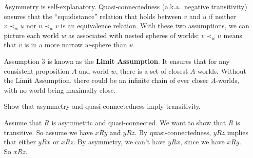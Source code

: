 Asymmetry is self-explanatory. Quasi-connectedness (a.k.a.\ negative
transitivity) ensures that the ``equidistance'' relation that holds between $v$
and $u$ if neither $v \prec_w u$ nor $u \prec_w v$ is an equivalence relation.
With these two assumptions, we can picture each world $w$ as associated with
nested spheres of worlds; $v \prec_w u$ means that $v$ is in a more narrow
$w$-sphere than $u$.

Assumption 3 is known as the \textbf{Limit Assumption}. It ensures that for any
consistent proposition $A$ and world $w$, there is a set of closest $A$-worlds.
Without the Limit Assumption, there could be an infinite chain of ever closer
$A$-worlds, with no world being maximally close.


\begin{exercise}
  Show that asymmetry and quasi-connectedness imply transitivity.
\end{exercise}
\begin{solution}
  Assume that $R$ is asymmetric and quasi-connected. We want to show that
  $R$ is transitive. So assume we have $xRy$ and $yRz$. By quasi-connectedness,
  $yRz$ implies that either $yRx$ or $xRz$. By asymmetry, we can't have $yRx$,
  since we have $xRy$. So $xRz$.
\end{solution}


